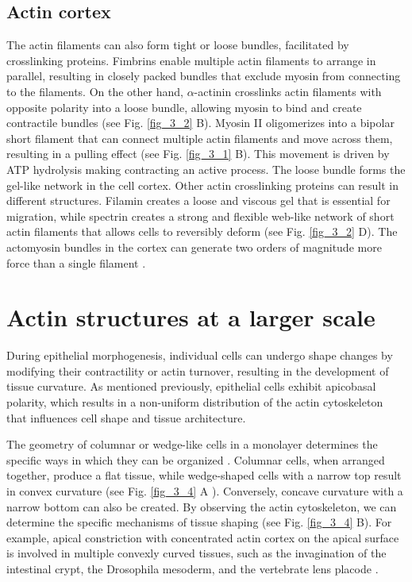 \hypertarget{actin-cortex}{%
	\subsection{Actin cortex}\label{actin-cortex}}

The actin filaments can also form tight or loose bundles, facilitated by crosslinking proteins. Fimbrins enable multiple actin filaments to arrange in parallel, resulting in closely packed bundles that exclude myosin from connecting to the filaments. On the other hand, $\alpha$-actinin crosslinks actin filaments with opposite polarity into a loose bundle, allowing myosin to bind and create contractile bundles (see Fig. \ref{fig_3_2} B). Myosin II oligomerizes into a bipolar short filament that can connect multiple actin filaments and move across them, resulting in a pulling effect (see Fig. \ref{fig_3_1} B). This movement is driven by ATP hydrolysis making contracting an active process. The loose bundle forms the gel-like network in the cell cortex. Other actin crosslinking proteins can result in different structures. Filamin creates a loose and viscous gel that is essential for migration, while spectrin creates a strong and flexible web-like network of short actin filaments that allows cells to reversibly deform (see Fig. \ref{fig_3_2} D). The actomyosin bundles in the cortex can generate two orders of magnitude more force than a single filament \cite{clarke2021}.


\hypertarget{actin-structures-at-a-larger-scale}{%
\section{Actin structures at a larger scale}\label{actin-structures-at-a-larger-scale}}

During epithelial morphogenesis, individual cells can undergo shape changes by modifying their contractility or actin turnover, resulting in the development of tissue curvature. As mentioned previously, epithelial cells exhibit apicobasal polarity, which results in a non-uniform distribution of the actin cytoskeleton that influences cell shape and tissue architecture.

The geometry of columnar or wedge-like cells in a monolayer determines the specific ways in which they can be organized \cite{gomez-galvez2021}. Columnar cells, when arranged together, produce a flat tissue, while wedge-shaped cells with a narrow top result in convex curvature (see Fig. \ref{fig_3_4} A ). Conversely, concave curvature with a narrow bottom can also be created. By observing the actin cytoskeleton, we can determine the specific mechanisms of tissue shaping (see Fig. \ref{fig_3_4} B). For example, apical constriction with concentrated actin cortex on the apical surface is involved in multiple convexly curved tissues, such as the invagination of the intestinal crypt, the Drosophila mesoderm, and the vertebrate lens placode \cite{perez-gonzalez2021, lecuit2011, houssin2020}.

